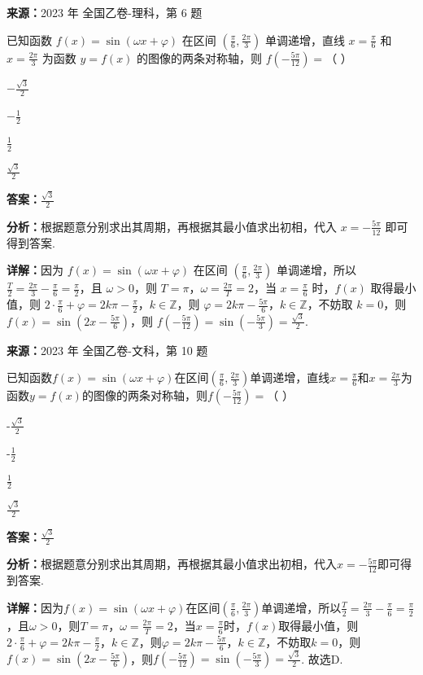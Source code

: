 \begin{question}[points=5]
\textbf{来源：}2023 年 全国乙卷-理科，第 6 题\par
已知函数 $f(x)=\sin(\omega x+\varphi)$ 在区间 $(\frac{\pi}{6},\frac{2\pi}{3})$ 单调递增，直线 $x=\frac{\pi}{6}$ 和 $x=\frac{2\pi}{3}$ 为函数 $y=f(x)$ 的图像的两条对称轴，则 $f(-\frac{5\pi}{12})=$（ ）
\begin{choices}
  \item $-\frac{\sqrt{3}}{2}$
  \item $-\frac{1}{2}$
  \item $\frac{1}{2}$
  \item $\frac{\sqrt{3}}{2}$
\end{choices}
\begin{solution}
\textbf{答案：}$\frac{\sqrt{3}}{2}$

\textbf{分析：}根据题意分别求出其周期，再根据其最小值求出初相，代入 $x=-\frac{5\pi}{12}$ 即可得到答案.

\textbf{详解：}因为 $f(x)=\sin(\omega x+\varphi)$ 在区间 $(\frac{\pi}{6},\frac{2\pi}{3})$ 单调递增，所以 $\frac{T}{2}=\frac{2\pi}{3}-\frac{\pi}{6}=\frac{\pi}{2}$，且 $\omega>0$，则 $T=\pi$，$\omega=\frac{2\pi}{T}=2$，当 $x=\frac{\pi}{6}$ 时，$f(x)$ 取得最小值，则 $2\cdot\frac{\pi}{6}+\varphi=2k\pi-\frac{\pi}{2}$，$k\in\mathbb{Z}$，则 $\varphi=2k\pi-\frac{5\pi}{6}$，$k\in\mathbb{Z}$，不妨取 $k=0$，则 $f(x)=\sin(2x-\frac{5\pi}{6})$，则 $f(-\frac{5\pi}{12})=\sin(-\frac{5\pi}{3})=\frac{\sqrt{3}}{2}$.
\end{solution}
\end{question}

\begin{question}[points=5]
\textbf{来源：}2023 年 全国乙卷-文科，第 10 题\par
已知函数$f(x)=\sin(\omega x+\varphi)$在区间$(\frac{\pi}{6},\frac{2\pi}{3})$单调递增，直线$x=\frac{\pi}{6}$和$x=\frac{2\pi}{3}$为函数$y=f(x)$的图像的两条对称轴，则$f(-\frac{5\pi}{12})=$（   ）
\begin{choices}
  \item -$\frac{\sqrt{3}}{2}$
  \item -$\frac{1}{2}$
  \item $\frac{1}{2}$
  \item $\frac{\sqrt{3}}{2}$
\end{choices}
\begin{solution}
\textbf{答案：}$\frac{\sqrt{3}}{2}$

\textbf{分析：}根据题意分别求出其周期，再根据其最小值求出初相，代入$x=-\frac{5\pi}{12}$即可得到答案.

\textbf{详解：}因为$f(x)=\sin(\omega x+\varphi)$在区间$(\frac{\pi}{6},\frac{2\pi}{3})$单调递增，所以$\frac{T}{2}=\frac{2\pi}{3}-\frac{\pi}{6}=\frac{\pi}{2}$，且$\omega>0$，则$T=\pi$，$\omega=\frac{2\pi}{T}=2$，当$x=\frac{\pi}{6}$时，$f(x)$取得最小值，则$2\cdot\frac{\pi}{6}+\varphi=2k\pi-\frac{\pi}{2}$，$k\in \mathbb{Z}$，则$\varphi=2k\pi-\frac{5\pi}{6}$，$k\in \mathbb{Z}$，不妨取$k=0$，则$f(x)=\sin(2x-\frac{5\pi}{6})$，则$f(-\frac{5\pi}{12})=\sin(-\frac{5\pi}{3})=\frac{\sqrt{3}}{2}$. 故选D.
\end{solution}
\end{question}


